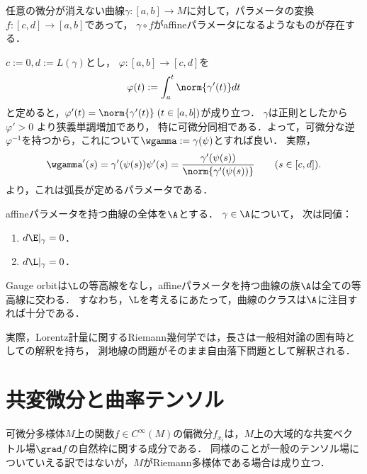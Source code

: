 \documentclass[uplatex,dvipdfmx]{jsreport}
\begin{document}
\begin{proposition}
    任意の微分が消えない曲線$\gamma:[a,b]\to M$に対して，パラメータの変換$f:[c,d]\to[a,b]$であって，
    $\gamma\circ f$がaffineパラメータになるようなものが存在する．
\end{proposition}
\begin{Proof}
    $c:=0,d:=L(\gamma)$とし，
    $\varphi:[a,b]\to[c,d]$を
    \[\varphi(t):=\int^{t}_a\norm{\gamma'(t)}dt\]
    と定めると，$\varphi'(t)=\norm{\gamma'(t)}\;(t\in[a,b])$が成り立つ．
    $\gamma$は正則としたから$\varphi'>0$
    より狭義単調増加であり，
    特に可微分同相である．よって，可微分な逆$\varphi^{-1}$を持つから，これについて$\wgamma:=\gamma(\psi)$とすれば良い．
    実際，
    \[\wgamma'(s)=\gamma'(\psi(s))\psi'(s)=\frac{\gamma'(\psi(s))}{\norm{\gamma'(\psi(s))}}\qquad(s\in[c,d]).\]
    より，これは弧長が定めるパラメータである．
\end{Proof}

\begin{theorem}[測地線であるためのエネルギー汎関数による必要条件]
    affineパラメータを持つ曲線の全体を$\A$とする．
    $\gamma\in\A$について，
    次は同値：
    \begin{enumerate}
        \item $d\E|_{\gamma}=0$．
        \item $d\L|_{\gamma}=0$．
    \end{enumerate}
\end{theorem}
\begin{remarks}
    Gauge orbitは$\L$の等高線をなし，affineパラメータを持つ曲線の族$\A$は全ての等高線に交わる．
    すなわち，$\L$を考えるにあたって，曲線のクラスは$\A$に注目すれば十分である．
\end{remarks}

\begin{remarks}
    実際，Lorentz計量に関するRiemann幾何学では，長さは一般相対論の固有時としての解釈を持ち，
    測地線の問題がそのまま自由落下問題として解釈される．
\end{remarks}

\section{共変微分と曲率テンソル}

\begin{tcolorbox}[colframe=ForestGreen, colback=ForestGreen!10!white,breakable,colbacktitle=ForestGreen!40!white,coltitle=black,fonttitle=\bfseries\sffamily,
title=]
    可微分多様体$M$上の関数$f\in C^\infty(M)$の偏微分$f_{x_i}$は，$M$上の大域的な共変ベクトル場$\grad f$の自然枠に関する成分である．
    同様のことが一般のテンソル場についていえる訳ではないが，$M$がRiemann多様体である場合は成り立つ．
\end{tcolorbox}
\end{document}
